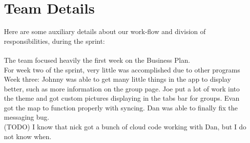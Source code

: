 \documentclass[11pt]{article}
\begin{document}
	
\section*{Team Details}
Here are some auxiliary details about our work-flow and division of responsibilities, during the sprint: \\\\

The team focused heavily the first week on the Business Plan.\\

For week two of the sprint, very little was accomplished due to other programs\\

Week three: Johnny was able to get many little things in the app to display better, such as more information on the group page. Joe put a lot of work into the theme and got custom pictures displaying in the tabs bar for groups. Evan got the map to function properly with syncing. Dan was able to finally fix the messaging bug.\\

(TODO) I know that nick got a bunch of cloud code working with Dan, but I do not know when.
\end{document}
